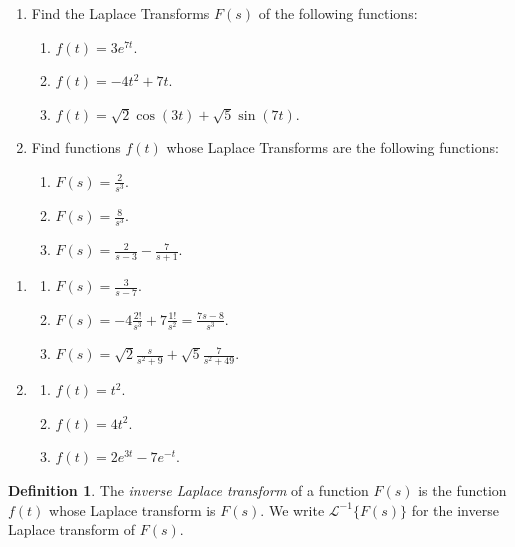 \documentclass[12pt]{amsart}
\numberwithin{equation}{section}
\theoremstyle{plain} %
\theoremstyle{definition}
\newtheorem{defn}[equation]{Definition}
\theoremstyle{remark}
\newcommand{\LAi}[1]{\mathcal{L}^{-1}\{ #1 \}}
\begin{document}
\begin{enumerate}
\item Find the Laplace Transforms $F(s)$ of the following functions:
\begin{enumerate}
\item $f(t)=3 e^{7t}$.
\item $f(t)=-4 t^2 + 7t$.
\item $f(t)=\sqrt{2} \cos(3 t) + \sqrt{5} \sin(7t)$.
\end{enumerate}
\item Find functions $f(t)$ whose Laplace Transforms are the following functions:
\begin{enumerate}
\item $F(s) = \displaystyle \frac{2}{s^3}$.
\item $F(s) = \displaystyle \frac{8}{s^3}$.
\item $F(s) = \displaystyle \frac{2}{s-3} - \frac{7}{s+1}$.
\end{enumerate}
\end{enumerate}
\begin{framed}
\begin{enumerate}
\item \begin{enumerate}
\item $F(s) = \displaystyle \frac{3}{s-7}$.
\item $F(s) = \displaystyle -4 \frac{2!}{s^3} +7 \frac{1!}{s^2} = \frac{7s-8}{s^3} $.
\item $F(s) = \displaystyle \sqrt{2}\frac{s}{s^2+9} + \sqrt{5} \frac{7}{s^2 + 49}$.
\end{enumerate}
\item \begin{enumerate}
\item $f(t) = t^2$.
\item $f(t) = 4t^2$.
\item $f(t) = 2e^{3t} - 7 e^{-t}$.
\end{enumerate}
\end{enumerate}
\end{framed}

\begin{defn}
The \emph{inverse Laplace transform} of a function $F(s)$ is the function $f(t)$ whose Laplace transform is $F(s)$. We write $\LAi{F(s)}$ for the inverse Laplace transform of $F(s)$.
\end{defn}
\end{document}
